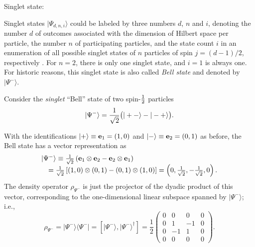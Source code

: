 {\begin{enumerate}
\end{enumerate}

{Singlet state:}




Singlet states $\vert \Psi_{d,n,i} \rangle$ could be labeled by three numbers $d$, $n$ and $i$,
denoting
the number $d$ of outcomes associated with the dimension of Hilbert space per particle,
the number $n$ of participating particles,
and the state count $i$ in an enumeration of all possible singlet states of $n$ particles of spin $j=(d-1)/2$, respectively
\cite{schimpf-svozil}.
For $n=2$, there is only one singlet state,
and $i=1$ is always one.
For historic reasons, this singlet state is also called {\em Bell state}  and denoted by $\vert {\Psi^-} \rangle $.

Consider the {\em singlet} ``Bell'' state of two spin-${1\over 2}$
particles
\begin{equation}
\vert {\Psi^-} \rangle
=
 {1\over \sqrt{2}}
\bigl(
\vert +- \rangle -
\vert -+ \rangle
\bigr)
.
\label{2009-gtq-s1s21}
\end{equation}

With the identifications
$
\vert +\rangle
\equiv {   {\bf e}}_1 =(1,0)
$
and
$
\vert -\rangle \equiv {   {\bf e}}_2 =(0,1)
$ as before,
the Bell state has a vector representation as
\begin{equation}
\begin{array}{lll}
\vert  {\Psi^-}\rangle
 \equiv
{1\over \sqrt{2}}\left({   {\bf e}}_1\otimes {   {\bf e}}_2-{   {\bf e}}_2\otimes {   {\bf e}}_1 \right) \\
\quad = {1\over \sqrt{2}}\left[ (1,0)\otimes (0,1) - (0,1) \otimes (1,0)\right]
=\left( 0,\frac{1}{\sqrt{2}},- \frac{1}{\sqrt{2}} ,  0 \right).
\end{array}
\label{2005-hp-ep12s1v}
\end{equation}
The density operator $\rho_{{\Psi^-}}$
is just the projector of the dyadic product of this vector, corresponding to the one-dimensional
linear subspace spanned by  $\vert  {\Psi^-}\rangle $; i.e.,
\begin{equation}
\rho_{{\Psi^-}} = \vert  {\Psi^-}\rangle \langle  {\Psi^-} \vert
=
\left[ \vert  {\Psi^-}\rangle ,\vert  {\Psi^-}\rangle^\dagger \right]
=
\frac{1}{2}
 \left(
\begin{array}{rrrr}
0&0&0&0\\
0&1&-1&0\\
0&-1&1&0\\
0&0&0&0
\end{array}
\right)
.
\end{equation}



}
